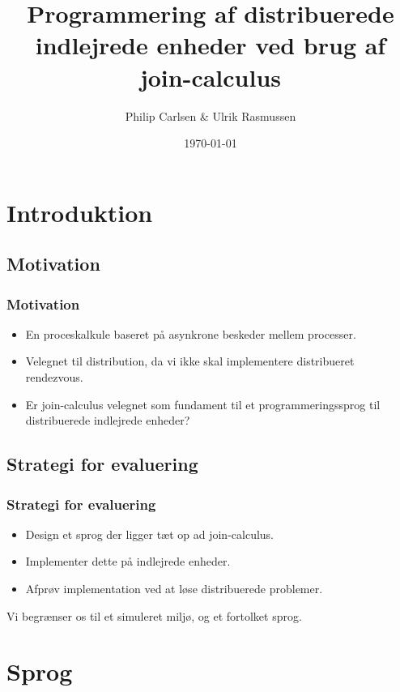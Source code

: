 \documentclass{beamer}
\title[Bachelorprojektforsvar]{Programmering af distribuerede indlejrede enheder ved brug af join-calculus}
\author{Philip Carlsen \& Ulrik Rasmussen}
\institute{\textrm{Datalogisk Institut, Københavns Universitet}}
\date{\today}
\begin{document}
\frame{\titlepage}

\section{Introduktion}

\subsection{Motivation}

\begin{frame}
\frametitle{Motivation}

\begin{itemize}
\item
    En proceskalkule baseret på asynkrone beskeder mellem processer.

\item
    Velegnet til distribution, da vi ikke skal implementere distribueret rendezvous.

\item
    Er join-calculus velegnet som fundament til et programmeringssprog til
    distribuerede indlejrede enheder?
\end{itemize}
\end{frame}


\subsection{Strategi for evaluering}

\begin{frame}
\frametitle{Strategi for evaluering}

\begin{itemize}
 \item Design et sprog der ligger tæt op ad join-calculus.
 \item Implementer dette på indlejrede enheder.
 \item Afprøv implementation ved at løse distribuerede problemer.
\end{itemize}

Vi begrænser os til et simuleret miljø, og et fortolket sprog.

\end{frame}


\section{Sprog}
\end{document}
